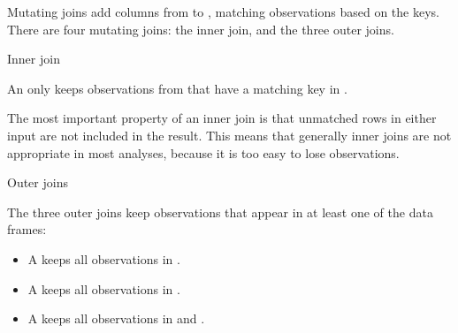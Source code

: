 \documentclass[a4paper]{book}
\begin{document}
%
\begin{Description}
Mutating joins add columns from  to , matching observations based on
the keys. There are four mutating joins: the inner join, and the three outer
joins.
%
\begin{SubSection}{Inner join}

An  only keeps observations from  that have a matching key
in .

The most important property of an inner join is that unmatched rows in either
input are not included in the result. This means that generally inner joins
are not appropriate in most analyses, because it is too easy to lose
observations.
\end{SubSection}


%
\begin{SubSection}{Outer joins}

The three outer joins keep observations that appear in at least one of the
data frames:
\begin{itemize}

\item{} A  keeps all observations in .
\item{} A  keeps all observations in .
\item{} A  keeps all observations in  and .

\end{itemize}

\end{SubSection}

\end{Description}
%
\end{document}
